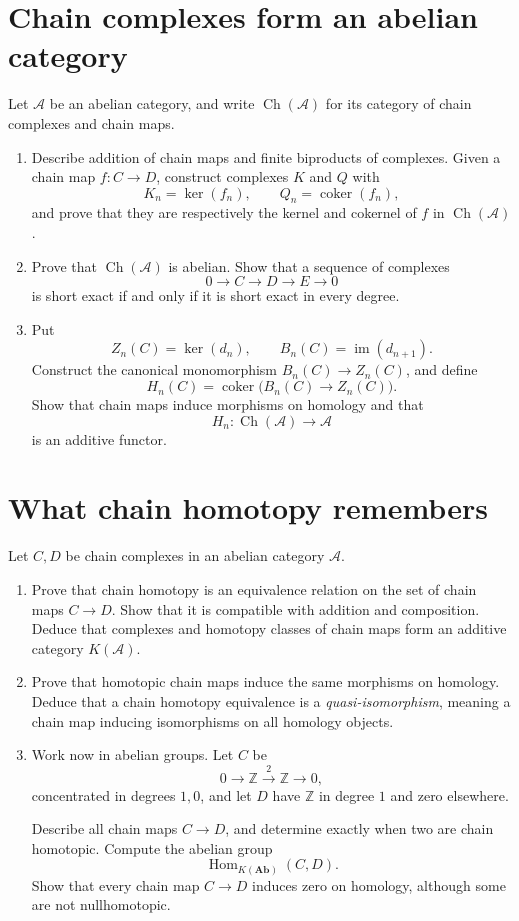 \documentclass[11pt]{article}
\DeclareMathOperator{\Hom}{Hom}
\DeclareMathOperator{\im}{im}
\DeclareMathOperator{\coker}{coker}
\DeclareMathOperator{\Ch}{Ch}
\newcommand{\Z}{\mathbb{Z}}
\begin{document}
\section{Chain complexes form an abelian category}
Let \(\mathcal A\) be an abelian category, and write
\(\Ch(\mathcal A)\) for its category of chain complexes and chain maps.
\begin{enumerate}
\item Describe addition of chain maps and finite biproducts of complexes.
Given a chain map \(f:C\to D\), construct complexes \(K\) and \(Q\) with
\[
K_n=\ker(f_n),\qquad Q_n=\coker(f_n),
\]
and prove that they are respectively the kernel and cokernel of \(f\) in
\(\Ch(\mathcal A)\).

\item Prove that \(\Ch(\mathcal A)\) is abelian. Show that a sequence
of complexes
\[
0\longrightarrow C\longrightarrow D\longrightarrow E\longrightarrow0
\]
is short exact if and only if it is short exact in every degree.

\item Put
\[
Z_n(C)=\ker(d_n),\qquad B_n(C)=\im(d_{n+1}).
\]
Construct the canonical monomorphism \(B_n(C)\to Z_n(C)\), and define
\[
H_n(C)=\coker\bigl(B_n(C)\longrightarrow Z_n(C)\bigr).
\]
Show that chain maps induce morphisms on homology and that
\[
H_n:\Ch(\mathcal A)\longrightarrow\mathcal A
\]
is an additive functor.
\end{enumerate}

\section{What chain homotopy remembers}
Let \(C,D\) be chain complexes in an abelian category \(\mathcal A\).
\begin{enumerate}
\item Prove that chain homotopy is an equivalence relation on the set of
chain maps \(C\to D\). Show that it is compatible with addition and
composition. Deduce that complexes and homotopy classes of chain maps
form an additive category \(K(\mathcal A)\).

\item Prove that homotopic chain maps induce the same morphisms on
homology. Deduce that a chain homotopy equivalence is a
\emph{quasi-isomorphism}, meaning a chain map inducing isomorphisms on
all homology objects.

\item Work now in abelian groups. Let \(C\) be
\[
0\longrightarrow\Z\xrightarrow{\,2\,}\Z\longrightarrow0,
\]
concentrated in degrees \(1,0\), and let \(D\) have \(\Z\) in degree
\(1\) and zero elsewhere.

Describe all chain maps \(C\to D\), and determine exactly when two are
chain homotopic. Compute the abelian group
\[
\Hom_{K(\mathbf{Ab})}(C,D).
\]
Show that every chain map \(C\to D\) induces zero on homology, although
some are not nullhomotopic.
\end{enumerate}
\end{document}
